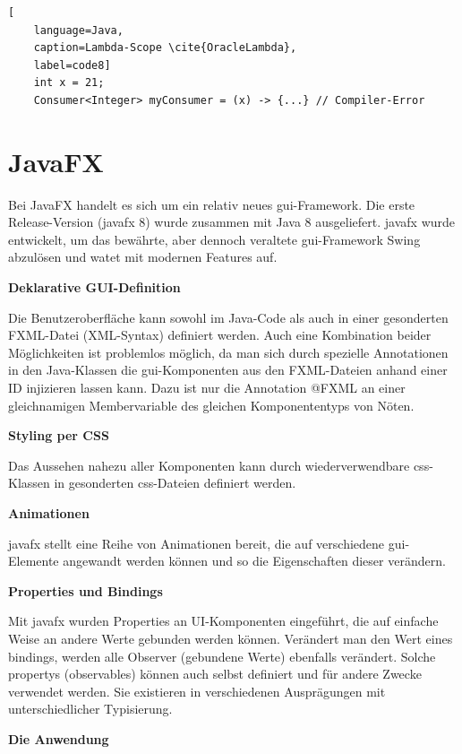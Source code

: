 \begin{lstlisting}[
    language=Java,
    caption=Lambda-Scope \cite{OracleLambda},
    label=code8]
	int x = 21;
	Consumer<Integer> myConsumer = (x) -> {...} // Compiler-Error
\end{lstlisting}

\section{JavaFX} \label{sec:grundJavaFX}
Bei JavaFX handelt es sich um ein relativ neues \gls{gui}-Framework. Die erste Release-Version (\gls{javafx} 8) wurde zusammen mit Java 8 ausgeliefert. \gls{javafx} wurde entwickelt, um das bewährte, aber dennoch veraltete \gls{gui}-Framework Swing abzulösen und watet mit modernen Features auf. \cite{Mueller2015}

\textbf{Deklarative GUI-Definition}

Die Benutzeroberfläche kann sowohl im Java-Code als auch in einer gesonderten FXML-Datei (XML-Syntax) definiert werden. Auch eine Kombination beider Möglichkeiten ist problemlos möglich, da man sich durch spezielle Annotationen in den Java-Klassen die \gls{gui}-Komponenten aus den FXML-Dateien anhand einer ID injizieren lassen kann. Dazu ist nur die Annotation @FXML an einer gleichnamigen Membervariable des gleichen Komponententyps von Nöten.

\textbf{Styling per CSS}

Das Aussehen nahezu aller Komponenten kann durch wiederverwendbare \gls{css}-Klassen in gesonderten \gls{css}-Dateien definiert werden. \cite{Mueller2015}

\textbf{Animationen}

\gls{javafx} stellt eine Reihe von Animationen bereit, die auf verschiedene \gls{gui}-Elemente angewandt werden können und so die Eigenschaften dieser verändern. \cite{Mueller2015}

\textbf{Properties und Bindings}

Mit \gls{javafx} wurden Properties an UI-Komponenten eingeführt, die auf einfache Weise an andere Werte gebunden werden können. Verändert man den Wert eines \gls{binding}s, werden alle Observer (gebundene Werte) ebenfalls verändert. \cite{Mueller2015} Solche \glspl{property} (\gls{observable}s) können auch selbst definiert und für andere Zwecke verwendet werden. Sie existieren in verschiedenen Ausprägungen mit unterschiedlicher Typisierung. \cite{OracleBindings}

\textbf{Die Anwendung}

